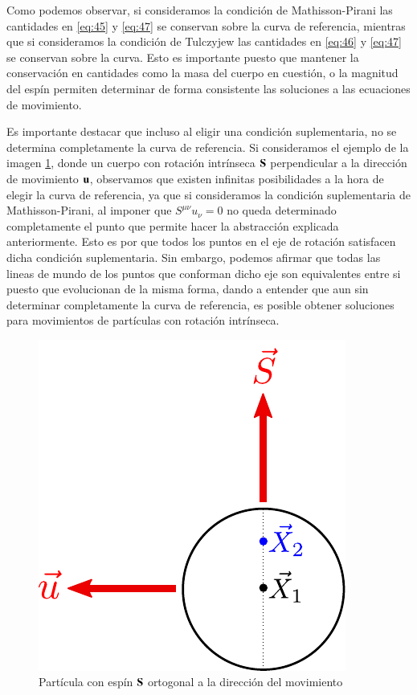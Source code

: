 Como podemos observar, si consideramos la condición de Mathisson-Pirani las cantidades en \eqref{eq:45} y \eqref{eq:47} se conservan sobre la curva de referencia, mientras que si consideramos la condición de Tulczyjew las cantidades en \eqref{eq:46} y \eqref{eq:47} se conservan sobre la curva. Esto es importante puesto que mantener la conservación en cantidades como la masa del cuerpo en cuestión, o la magnitud del espín permiten determinar de forma consistente las soluciones a las ecuaciones de movimiento.

Es importante destacar que incluso al eligir una condición suplementaria, no se determina completamente la curva de referencia. Si consideramos el ejemplo de la imagen \ref{fig:pirani}, donde un cuerpo con rotación intrínseca $\vb{S}$ perpendicular a la dirección de movimiento $\vb{u}$, observamos que existen infinitas posibilidades a la hora de elegir la curva de referencia, ya que si consideramos la condición suplementaria de Mathisson-Pirani, al imponer que $S^{\mu \nu} u_{\nu} = 0$ no queda determinado completamente el punto que permite hacer la abstracción explicada anteriormente. Esto es por que todos los puntos en el eje de rotación satisfacen dicha condición suplementaria. Sin embargo, podemos afirmar que todas las lineas de mundo de los puntos que conforman dicho eje son equivalentes entre si puesto que evolucionan de la misma forma, dando a entender que aun sin determinar completamente la curva de referencia, es posible obtener soluciones para movimientos de partículas con rotación intrínseca.

\begin{figure}[!h]
\centering
\includegraphics[scale=1]{images/cond-suplementaria.pdf}
\caption[Condición suplementaria de Pirani]{Partícula con espín $\vb{S}$ ortogonal a la dirección del movimiento}
\label{fig:pirani}
\end{figure}

